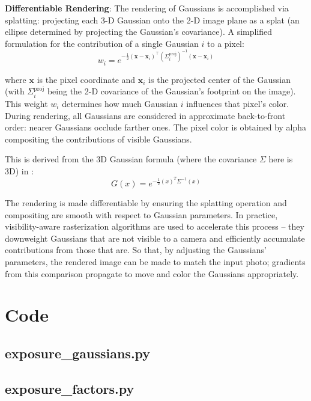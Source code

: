 \documentclass[11pt,a4paper]{article}
\begin{document}
\textbf{Differentiable Rendering}: The rendering of Gaussians is accomplished via splatting: projecting each 3-D Gaussian onto the 2-D image plane as a splat (an ellipse determined by projecting the Gaussian's covariance). A simplified formulation for the contribution of a single Gaussian $i$ to a pixel:
\begin{equation*}
w_i = e^{-\frac{1}{2}(\mathbf{x}-\mathbf{x}_i)^{\top}\left(\Sigma_i^{\mathrm{proj}}\right)^{-1}(\mathbf{x}-\mathbf{x}_i)}
\end{equation*}

where $\mathbf{x}$ is the pixel coordinate and $\mathbf{x}_i$ is the projected center of the Gaussian (with $\Sigma_i^{\mathrm{proj}}$ being the 2-D covariance of the Gaussian's footprint on the image). This weight $w_i$ determines how much Gaussian $i$ influences that pixel's color. During rendering, all Gaussians are considered in approximate back-to-front order: nearer Gaussians occlude farther ones. The pixel color is obtained by alpha compositing the contributions of visible Gaussians.

This is derived from the 3D Gaussian formula (where the covariance $\Sigma$ here is 3D) in \cite{ref4}:
\begin{equation*}
G(x) = e^{-\frac{1}{2}(x)^{T}\Sigma^{-1}(x)}
\end{equation*}

The rendering is made differentiable by ensuring the splatting operation and compositing are smooth with respect to Gaussian parameters. In practice, visibility-aware rasterization algorithms are used to accelerate this process -- they downweight Gaussians that are not visible to a camera and efficiently accumulate contributions from those that are. So that, by adjusting the Gaussians' parameters, the rendered image can be made to match the input photo; gradients from this comparison propagate to move and color the Gaussians appropriately.

\section{Code}

\subsection{exposure\_gaussians.py}



\subsection{exposure\_factors.py}
\end{document}
